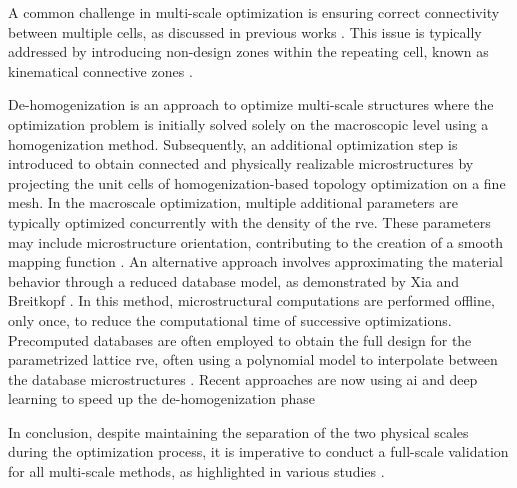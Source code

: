 A common challenge in multi-scale optimization is ensuring correct connectivity between multiple cells, as discussed in previous works . This issue is typically addressed by introducing non-design zones within the repeating cell, known as kinematical connective zones .

De-homogenization is an approach to optimize multi-scale structures where the optimization problem is initially solved solely on the macroscopic level using a homogenization method. Subsequently, an additional optimization step is introduced to obtain connected and physically realizable microstructures by projecting the unit cells of homogenization-based topology optimization on a fine mesh. In the macroscale optimization, multiple additional parameters are typically optimized concurrently with the density of the \gls{rve}. These parameters may include microstructure orientation, contributing to the creation of a smooth mapping function . An alternative approach involves approximating the material behavior through a reduced database model, as demonstrated by Xia and Breitkopf . In this method, microstructural computations are performed offline, only once, to reduce the computational time of successive optimizations. Precomputed databases are often employed to obtain the full design for the parametrized lattice \gls{rve}, often using a polynomial model to interpolate between the database microstructures . Recent approaches are now using \gls{ai} and deep learning to speed up the de-homogenization phase~ 

In conclusion, despite maintaining the separation of the two physical scales during the optimization process, it is imperative to conduct a full-scale validation for all multi-scale methods, as highlighted in various studies . 


